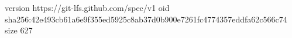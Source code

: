 version https://git-lfs.github.com/spec/v1
oid sha256:42e493cb61a6e9f355ed5925c8ab37d0b900e7261fc4774357eddfa62c566c74
size 627
